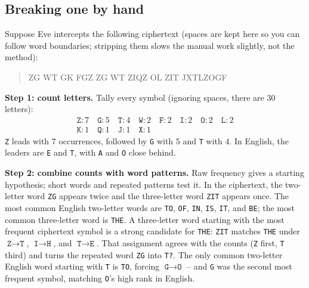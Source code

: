 \subsection{Breaking one by hand}
\label{ch02:break-substitution}

Suppose Eve intercepts the following ciphertext (spaces are kept here so you can follow
word boundaries; stripping them slows the manual work slightly, not the method):

\begin{quote}\ttfamily
ZG WT GK FGZ ZG WT ZIQZ OL ZIT JXTLZOGF
\end{quote}

\textbf{Step 1: count letters.} Tally every symbol (ignoring spaces, there are $30$ letters):
\[
\begin{array}{l}
\texttt{Z}: 7 \quad \texttt{G}: 5 \quad \texttt{T}: 4 \quad \texttt{W}: 2 \quad \texttt{F}: 2
\quad \texttt{I}: 2 \quad \texttt{O}: 2 \quad \texttt{L}: 2\\
\texttt{K}: 1 \quad \texttt{Q}: 1 \quad \texttt{J}: 1 \quad \texttt{X}: 1
\end{array}
\]
\texttt{Z} leads with $7$ occurrences, followed by \texttt{G} with $5$ and \texttt{T} with $4$.
In English, the leaders are \texttt{E} and \texttt{T}, with \texttt{A} and \texttt{O} close behind.

\textbf{Step 2: combine counts with word patterns.} Raw frequency gives a starting hypothesis;
short words and repeated patterns test it. In the ciphertext, the two-letter word \texttt{ZG}
appears twice and the three-letter word \texttt{ZIT} appears once. The most common English
two-letter words are \texttt{TO}, \texttt{OF}, \texttt{IN}, \texttt{IS}, \texttt{IT}, and
\texttt{BE}; the most common three-letter word is \texttt{THE}. A three-letter word starting
with the most frequent ciphertext symbol is a strong candidate for \texttt{THE}: \texttt{ZIT}
matches \texttt{THE} under $\texttt{Z} \to \texttt{T}$, $\texttt{I} \to \texttt{H}$, and
$\texttt{T} \to \texttt{E}$. That assignment agrees with the counts (\texttt{Z} first,
\texttt{T} third) and turns the repeated word \texttt{ZG} into \texttt{T?}. The only common
two-letter English word starting with \texttt{T} is \texttt{TO}, forcing $\texttt{G} \to
\texttt{O}$ -- and \texttt{G} was the second most frequent symbol, matching \texttt{O}'s high
rank in English.


